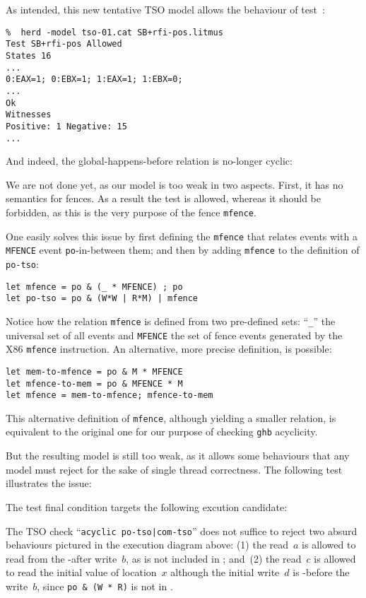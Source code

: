 As intended, this new tentative TSO model allows the behaviour of test~:
\begin{verbatim}
%  herd -model tso-01.cat SB+rfi-pos.litmus
Test SB+rfi-pos Allowed
States 16
...
0:EAX=1; 0:EBX=1; 1:EAX=1; 1:EBX=0;
...
Ok
Witnesses
Positive: 1 Negative: 15
...
\end{verbatim}
And indeed, the global-happens-before relation is no-longer cyclic:
\begin{center}\end{center}


We are not done yet, as our model is too weak in two aspects.
First, it has no semantics for fences.
As a result the test  is allowed, whereas it should
be forbidden, as this is the very purpose of the fence \texttt{mfence}.
\begin{center}\end{center}
One easily solves this issue by first defining the \verb+mfence+
that relates events with a \verb+MFENCE+ event \texttt{po}-in-between them;
and then by adding \verb+mfence+ to the definition of \verb+po-tso+:
\begin{verbatim}
let mfence = po & (_ * MFENCE) ; po
let po-tso = po & (W*W | R*M) | mfence
\end{verbatim}
Notice how the relation \verb+mfence+ is defined from two pre-defined sets:
``\verb+_+'' the universal set of all events and \verb+MFENCE+ the set
of fence events generated by the X86 \texttt{mfence} instruction.
An alternative, more precise definition, is possible:
\begin{verbatim}
let mem-to-mfence = po & M * MFENCE
let mfence-to-mem = po & MFENCE * M
let mfence = mem-to-mfence; mfence-to-mem
\end{verbatim}
This alternative definition of \texttt{mfence},
although yielding a smaller relation, is equivalent to the original one
for our purpose of checking \texttt{ghb} acyclicity.

But the resulting model is still too weak,
as it allows some behaviours that any model must
reject for the sake of single thread correctness.
The following test  illustrates the issue:

The test final condition targets the following excution candidate:
\begin{center}\end{center}
The TSO check ``\verb+acyclic po-tso|com-tso+'' does not suffice to reject
two absurd behaviours pictured in the execution diagram above:
(1) the read~$a$ is allowed to
read from the -after write~$b$, as  is not included
in ; and~(2)
the read~$c$ is allowed to read the initial value of location~$x$
although the initial write~$d$ is -before the write~$b$,
since \verb+po & (W * R)+ is not in .

